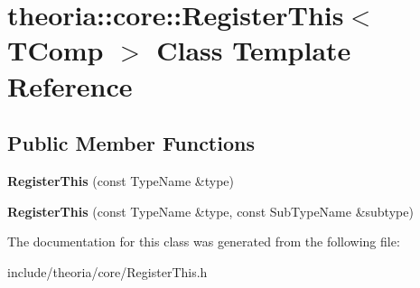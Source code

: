 \hypertarget{classtheoria_1_1core_1_1RegisterThis}{}\section{theoria\+:\+:core\+:\+:Register\+This$<$ T\+Comp $>$ Class Template Reference}
\label{classtheoria_1_1core_1_1RegisterThis}
\subsection*{Public Member Functions}
\begin{DoxyCompactItemize}
\item 
\mbox{\label{classtheoria_1_1core_1_1RegisterThis_ad736eff7aa2b6819197a839a08382f20}} 
{\bfseries Register\+This} (const Type\+Name \&type)
\item 
\mbox{\label{classtheoria_1_1core_1_1RegisterThis_aec0af7608af32e2b828c7e3953af3695}} 
{\bfseries Register\+This} (const Type\+Name \&type, const Sub\+Type\+Name \&subtype)
\end{DoxyCompactItemize}


The documentation for this class was generated from the following file\+:\begin{DoxyCompactItemize}
\item 
include/theoria/core/Register\+This.\+h\end{DoxyCompactItemize}
